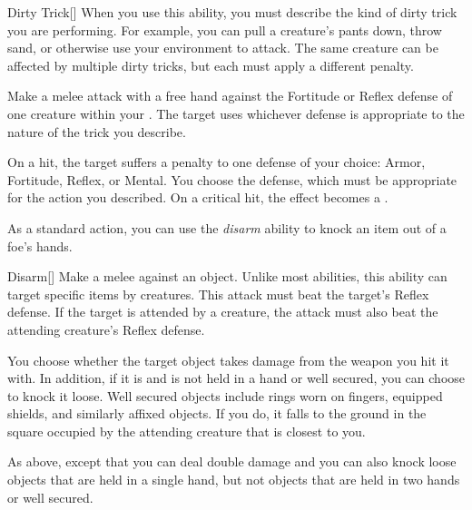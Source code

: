         \begin{activeability}{Dirty Trick}[]
            \rankline
            When you use this ability, you must describe the kind of dirty trick you are performing.
            For example, you can pull a creature's pants down, throw sand, or otherwise use your environment to attack.
            The same creature can be affected by multiple dirty tricks, but each must apply a different penalty.

            Make a melee attack with a free hand against the Fortitude or Reflex defense of one creature within your .
            The target uses whichever defense is appropriate to the nature of the trick you describe.

            On a hit, the target  suffers a  penalty to one defense of your choice: Armor, Fortitude, Reflex, or Mental.
            You choose the defense, which must be appropriate for the action you described.
            On a critical hit, the effect becomes a .
        \end{activeability}

        \label{Disarm} As a standard action, you can use the \textit{disarm} ability to knock an item out of a foe's hands.

        \begin{activeability}{Disarm}[]
            \rankline
            Make a melee  against an object.
            Unlike most abilities, this ability can target specific items  by creatures.
            This attack must beat the target's Reflex defense.
            If the target is attended by a creature, the attack must also beat the attending creature's Reflex defense.

            \hit You choose whether the target object takes damage from the weapon you hit it with.
            In addition, if it is  and is not held in a hand or well secured, you can choose to knock it loose.
            Well secured objects include rings worn on fingers, equipped shields, and similarly affixed objects.
            If you do, it falls to the ground in the square occupied by the attending creature that is closest to you.

            \crit As above, except that you can deal double damage and you can also knock loose objects that are held in a single hand, but not objects that are held in two hands or well secured.
        \end{activeability}

